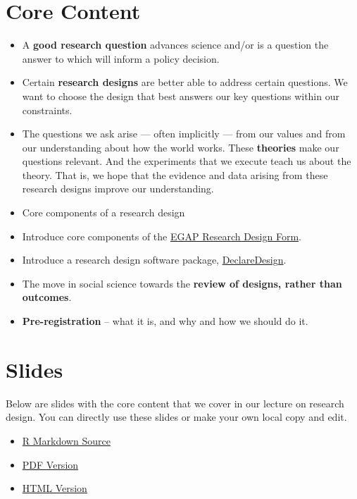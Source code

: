 \documentclass[12pt,]{book}
\begin{document}
\hypertarget{core-content}{%
\section{Core Content}\label{core-content}}

\begin{itemize}
\item
  A \textbf{good research question} advances science and/or is a question the answer to which will inform a policy decision.
\item
  Certain \textbf{research designs} are better able to address certain questions. We want to choose the design that best answers our key questions within our constraints.
\item
  The questions we ask arise --- often implicitly --- from our values and from our understanding about how the world works. These \textbf{theories} make our questions relevant. And the experiments that we execute teach us about the theory. That is, we hope that the evidence and data arising from these research designs improve our understanding.
\item
  Core components of a research design
\item
  Introduce core components of the \href{https://egap.github.io/learningdays-resources/Exercises/design-form.html}{EGAP Research Design Form}.
\item
  Introduce a research design software package, \href{http://declaredesign.org}{DeclareDesign}.
\item
  The move in social science towards the \textbf{review of designs, rather than outcomes}.
\item
  \textbf{Pre-registration} -- what it is, and why and how we should do it.
\end{itemize}

\hypertarget{slides}{%
\section{Slides}\label{slides}}

Below are slides with the core content that we cover in our lecture on research design. You can directly use these slides or make your own local copy and edit.

\begin{itemize}
\item
  \href{https://egap.github.io/learningdays-resources/Slides/researchdesignform-slides.Rmd}{R Markdown Source}
\item
  \href{https://egap.github.io/learningdays-resources/Slides/researchdesignform-slides.pdf}{PDF Version}
\item
  \href{https://egap.github.io/learningdays-resources/Slides/researchdesignform-slides.html}{HTML Version}
\end{itemize}
\end{document}
